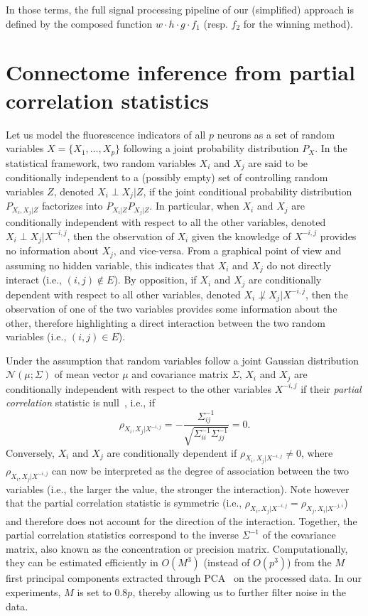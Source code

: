 \documentclass[wcp]{jmlr}
\begin{document}
In those terms, the full signal processing pipeline of our (simplified)
approach is defined by the composed function $w \cdot h \cdot g \cdot f_1$
(resp. $f_2$ for the winning method).


\section{Connectome inference from partial correlation statistics}
\label{sec:inference}

Let us model the fluorescence indicators of all $p$ neurons as a set of random
variables $X = \{X_1, \dots, X_p\}$ following a joint probability distribution
$P_X$. In the statistical framework, two random variables $X_i$ and $X_j$ are
said to be conditionally independent to a (possibly empty) set of controlling
random variables $Z$, denoted $X_i \perp X_j | Z$, if the joint conditional
probability distribution $P_{X_i, X_j | Z}$ factorizes into $P_{X_i|Z}
P_{X_j|Z}$. In particular, when $X_i$ and $X_j$ are conditionally independent
with respect to all the other variables, denoted $X_i \perp X_j | X^{-i,j}$, then the
observation of $X_i$ given the knowledge of $X^{-i,j}$ provides no information
about $X_j$, and vice-versa. From a graphical point of view and assuming no
hidden variable, this indicates that $X_i$ and $X_j$ do not directly interact
(i.e., $(i,j) \notin E$). By opposition, if $X_i$ and $X_j$ are conditionally
dependent with respect to all other variables, denoted $X_i \not\perp X_j |
X^{-i,j}$, then the observation of one of the two variables provides some
information about the other, therefore highlighting a direct interaction
between the two random variables (i.e., $(i, j) \in E$).

Under the assumption that random variables follow a joint Gaussian
distribution $\mathcal{N}(\mu; \Sigma)$ of mean vector $\mu$ and covariance
matrix $\Sigma$, $X_i$ and $X_j$ are conditionally independent with respect to
the other variables $X^{-i,j}$ if their \textit{partial correlation} statistic
is null~\citep{koller2009probabilistic}, i.e., if
\begin{equation}
\rho_{X_i, X_j | X^{-i,j}} = -\frac{\Sigma^{-1}_{ij}}{\sqrt{\Sigma^{-1}_{ii} \Sigma^{-1}_{jj}}} = 0.
\end{equation}
Conversely, $X_i$ and $X_j$ are conditionally dependent if $\rho_{X_i, X_j | X^{-i,j}} \neq 0$,
where $\rho_{X_i, X_j | X^{-i,j}}$ can now be interpreted as the degree of association
between the two variables (i.e., the larger the value, the stronger the interaction).
Note however that the partial correlation statistic is symmetric (i.e., $\rho_{X_i, X_j | X^{-i,j}} = \rho_{X_j, X_i | X^{-j,i}}$) and therefore does not account for the direction of the interaction.
Together, the partial correlation statistics correspond to the inverse
$\Sigma^{-1}$ of the covariance matrix, also known as the concentration or
precision matrix. Computationally, they can be estimated efficiently in
$O(M^3)$ (instead of $O(p^3)$) from the $M$ first principal components
extracted through PCA~\citep{bishop2006pattern} on the processed data. In our experiments, $M$ is set
to $0.8 p$, thereby allowing us to further filter noise in the data.
\end{document}
